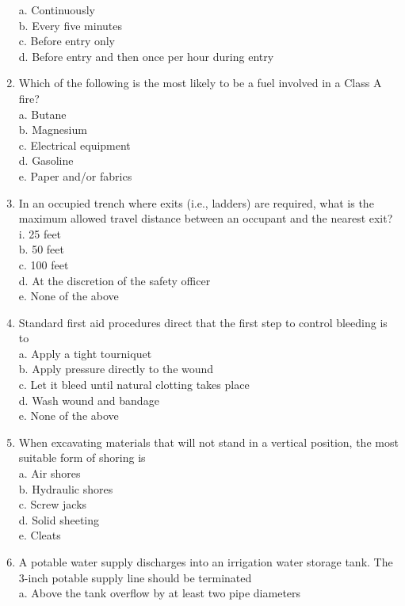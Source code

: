 \documentclass{article}
\begin{document}
\begin{enumerate}
a.  Continuously\\
b.  Every five minutes\\
c. Before entry only\\
d. Before entry and then once per hour during entry\\
  \item Which of the following is the most likely to be a fuel involved in a Class A fire?\\
a. Butane\\
b. Magnesium\\
c. Electrical equipment\\
d. Gasoline\\
e. Paper and/or fabrics\\
  \item In an occupied trench where exits (i.e., ladders) are required, what is the maximum allowed travel distance between an occupant and the nearest exit?\\
i. 25 feet\\
b. 50 feet\\
c. 100 feet\\
d. At the discretion of the safety officer\\
e. None of the above\\
  \item Standard first aid procedures direct that the first step to control bleeding is to\\
a. Apply a tight tourniquet\\
b. Apply pressure directly to the wound\\
c. Let it bleed until natural clotting takes place\\
d. Wash wound and bandage\\
e. None of the above\\
  \item When excavating materials that will not stand in a vertical position, the most suitable form of shoring is\\
a. Air shores\\
b. Hydraulic shores\\
c. Screw jacks\\
d. Solid sheeting\\
e. Cleats\\
  \item A potable water supply discharges into an irrigation water storage tank. The 3-inch potable supply line should be terminated\\
a. Above the tank overflow by at least two pipe diameters\\

\end{enumerate}
\end{document}
